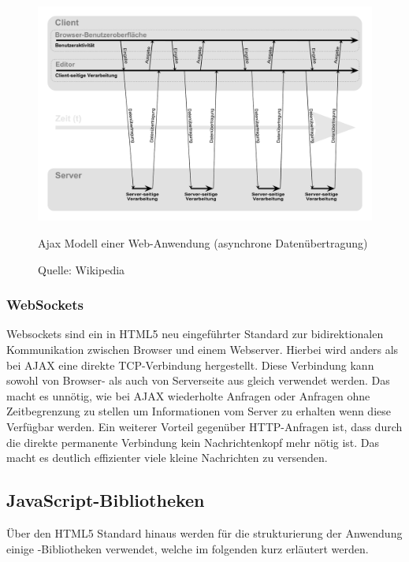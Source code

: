 \begin{figure}[ht]
\includegraphics[width=\linewidth]{images/diagram-ajax}
  \caption{Ajax Modell einer Web-Anwendung (asynchrone Datenübertragung)}
  \caption*{Quelle: Wikipedia}
  \label{fig:diagram-ajax}
\end{figure}


\subsubsection{WebSockets}

Websockets sind ein in HTML5 neu eingeführter Standard zur bidirektionalen  Kommunikation zwischen
Browser und einem Webserver. Hierbei wird anders als bei  AJAX eine direkte TCP-Verbindung
hergestellt. Diese Verbindung kann sowohl von  Browser- als auch von Serverseite aus gleich
verwendet werden. Das macht es  unnötig, wie bei AJAX wiederholte Anfragen oder Anfragen ohne
Zeitbegrenzung zu  stellen um Informationen vom Server zu erhalten wenn diese Verfügbar werden. Ein
weiterer Vorteil gegenüber HTTP-Anfragen ist, dass durch die direkte permanente Verbindung kein
Nachrichtenkopf mehr nötig ist. Das macht es deutlich  effizienter viele kleine Nachrichten zu
versenden. 

\subsection{JavaScript-Bibliotheken}

Über den HTML5 Standard hinaus werden für die strukturierung der Anwendung einige
-Bibliotheken verwendet, welche im folgenden kurz erläutert werden.

